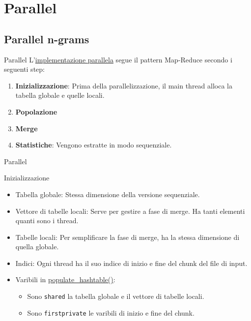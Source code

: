 \section{Parallel}
\subsection{Parallel n-grams}

\begin{frame}{Parallel}
    L'\href{https://github.com/edoardosarri24/parallel-n_grams/blob/master/parallel/src/main.c}{implementazione parallela} segue il pattern Map-Reduce secondo i seguenti step:
    \begin{enumerate}
        \item \textbf{Inizializzazione}: Prima della parallelizzazione, il main thread alloca la tabella globale e quelle locali.
        \item \textbf{Popolazione}
        \item \textbf{Merge}
        \item \textbf{Statistiche}: Vengono estratte in modo sequenziale.
    \end{enumerate}
\end{frame}

\begin{frame}{Parallel}
    \begin{block}{Inizializzazione}
        \begin{itemize}
            \item Tabella globale: Stessa dimensione della versione sequenziale.
            \item Vettore di tabelle locali: Serve per gestire a fase di merge. Ha tanti elementi quanti sono i thread.
            \item Tabelle locali: Per semplificare la fase di merge, ha la stessa dimensione di quella globale.
            \item Indici: Ogni thread ha il suo indice di inizio e fine del chunk del file di input.
            \item Varibili in \href{https://github.com/edoardosarri24/parallel-n_grams/blob/9a8df20839285bb66af1c2f3734a530712e590b4/parallel/src/main_functions.c}{populate\_hashtable()}:
            \begin{itemize}
                \item Sono \texttt{shared} la tabella globale e il vettore di tabelle locali.
                \item Sono \texttt{firstprivate} le varibili di inizio e fine del chunk.
            \end{itemize}
        \end{itemize}
    \end{block}
\end{frame}

